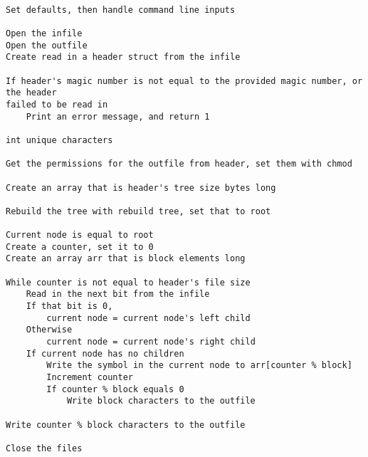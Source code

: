 \documentclass[11pt]{article}
\begin{document}
\begin{verbatim}

Set defaults, then handle command line inputs

Open the infile
Open the outfile
Create read in a header struct from the infile

If header's magic number is not equal to the provided magic number, or the header
failed to be read in
    Print an error message, and return 1

int unique characters

Get the permissions for the outfile from header, set them with chmod

Create an array that is header's tree size bytes long

Rebuild the tree with rebuild tree, set that to root

Current node is equal to root
Create a counter, set it to 0
Create an array arr that is block elements long

While counter is not equal to header's file size
    Read in the next bit from the infile
    If that bit is 0,
        current node = current node's left child
    Otherwise
        current node = current node's right child
    If current node has no children
        Write the symbol in the current node to arr[counter % block]
        Increment counter
        If counter % block equals 0
            Write block characters to the outfile

Write counter % block characters to the outfile

Close the files

\end{verbatim}
\end{document}
